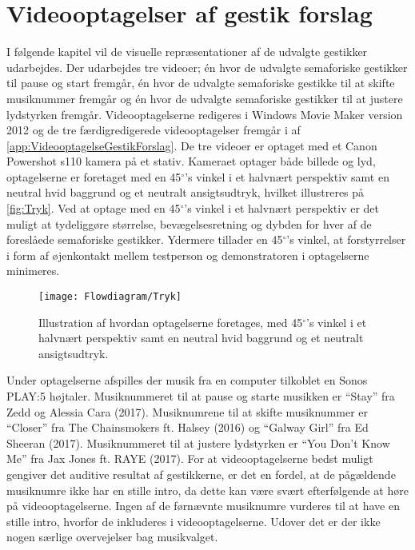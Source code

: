 \chapter{Videooptagelser af gestik forslag}
\label{app:VideooptagelserValgAfGestikker}
%
I følgende kapitel vil de visuelle repræsentationer af de udvalgte gestikker udarbejdes. Der udarbejdes tre videoer; én hvor de udvalgte semaforiske gestikker til pause og start fremgår, én hvor de udvalgte semaforiske gestikke til at skifte musiknummer fremgår og én hvor de udvalgte semaforiske gestikker til at justere lydstyrken fremgår. Videooptagelserne redigeres i Windows Movie Maker version 2012 og de tre færdigredigerede videooptagelser fremgår i af \autoref{app:VideooptagelseGestikForslag}.\blankline
%
De tre videoer er optaget med et Canon Powershot s110 kamera på et stativ. Kameraet optager både billede og lyd, optagelserne er foretaget med en 45$^{\circ}$'s vinkel i et halvnært perspektiv samt en neutral hvid baggrund og et neutralt ansigtsudtryk, hvilket illustreres på \autoref{fig:Tryk}. Ved at optage med en 45$^{\circ}$'s vinkel i et halvnært perspektiv er det muligt at tydeliggøre størrelse, bevægelsesretning og dybden for hver af de foreslåede semaforiske gestikker. Ydermere tillader en 45$^{\circ}$'s vinkel, at forstyrrelser i form af øjenkontakt mellem testperson og demonstratoren i optagelserne minimeres. 
%
\begin{figure}[H]
	\centering
	\texttt{[image: Flowdiagram/Tryk]}
	\caption{Illustration af hvordan optagelserne foretages, med 45$^{\circ}$'s vinkel i et halvnært perspektiv samt en neutral hvid baggrund og et neutralt ansigtsudtryk.}
	\label{fig:Tryk}
\end{figure}
\noindent
%
Under optagelserne afspilles der musik fra en computer tilkoblet en Sonos PLAY:5 højtaler. Musiknummeret til at pause og starte musikken er \enquote{Stay} fra Zedd og Alessia Cara (2017). Musiknumrene til at skifte musiknummer er \enquote{Closer} fra The Chainsmokers ft. Halsey (2016) og \enquote{Galway Girl} fra Ed Sheeran (2017). Musiknummeret til at justere lydstyrken er \enquote{You Don't Know Me} fra Jax Jones ft. RAYE (2017). For at videooptagelserne bedst muligt gengiver det auditive resultat af gestikkerne, er det en fordel, at de pågældende musiknumre ikke har en stille intro, da dette kan være svært efterfølgende at høre på videooptagelserne. Ingen af de førnævnte musiknumre vurderes til at have en stille intro, hvorfor de inkluderes i videooptagelserne. Udover det er der ikke nogen særlige overvejelser bag musikvalget. 

